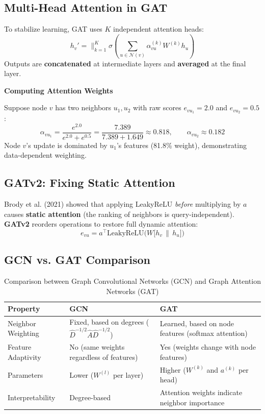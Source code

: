 \documentclass[12pt,a4paper]{article}
\begin{document}
\subsection{Multi-Head Attention in GAT}

To stabilize learning, GAT uses $K$ independent attention heads:
\[
h_v' = \Big\|_{k=1}^{K} \sigma\left(\sum_{u \in \mathcal{N}(v)} \alpha_{vu}^{(k)} W^{(k)} h_u\right)
\]
Outputs are \textbf{concatenated} at intermediate layers and \textbf{averaged} at the final layer.

\begin{example}
\textbf{Computing Attention Weights}

Suppose node $v$ has two neighbors $u_1, u_2$ with raw scores $e_{vu_1} = 2.0$ and $e_{vu_2} = 0.5$:
\[
\alpha_{vu_1} = \frac{e^{2.0}}{e^{2.0}+e^{0.5}} = \frac{7.389}{7.389+1.649} \approx 0.818, \qquad \alpha_{vu_2} \approx 0.182
\]
Node $v$'s update is dominated by $u_1$'s features (81.8\% weight), demonstrating data-dependent weighting.
\end{example}

\subsection{GATv2: Fixing Static Attention}

Brody et al. (2021) showed that applying LeakyReLU \emph{before} multiplying by $a$ causes \textbf{static attention} (the ranking of neighbors is query-independent). \textbf{GATv2} reorders operations to restore full dynamic attention:
\[
e_{vu} = a^\top \text{LeakyReLU}\Big(W\big[h_v \,\|\, h_u\big]\Big)
\]

\subsection{GCN vs. GAT Comparison}

\begin{table}[h!]
\centering
\renewcommand{\arraystretch}{1.3}
\begin{tabular}{|l|p{5cm}|p{5cm}|}
\hline
\textbf{Property} & \textbf{GCN} & \textbf{GAT} \\
\hline
Neighbor Weighting & Fixed, based on degrees ($\hat{D}^{-1/2}\hat{A}\hat{D}^{-1/2}$) & Learned, based on node features (softmax attention) \\
Feature Adaptivity & No (same weights regardless of features) & Yes (weights change with node features) \\
Parameters & Lower ($W^{(l)}$ per layer) & Higher ($W^{(k)}$ and $a^{(k)}$ per head) \\
Interpretability & Degree-based & Attention weights indicate neighbor importance \\
\hline
\end{tabular}
\caption{Comparison between Graph Convolutional Networks (GCN) and Graph Attention Networks (GAT)}
\end{table}
\end{document}
